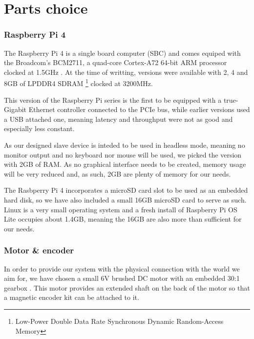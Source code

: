 \section{Parts choice} \label{sec:parts_choice}



\subsubsection{Raspberry Pi 4}
The Raspberry Pi 4 is a single board computer (SBC) and comes equiped with the Broadcom's BCM2711, a quad-core Cortex-A72 64-bit ARM processor clocked at 1.5GHz \cite{technology:rpi4-specs}.
At the time of writting, versions were available with 2, 4 and 8GB of LPDDR4 SDRAM \footnote{Low-Power Double Data Rate Synchronous Dynamic Random-Access Memory} clocked at 3200MHz.

This version of the Raspberry Pi series is the first to be equipped with a true-Gigabit Ethernet controller connected to the PCIe bus, while earlier versions used a USB attached one, meaning latency and throughput were not as good and especially less constant.

As our designed slave device is inteded to be used in headless mode, meaning no monitor output and no keyboard nor mouse will be used, we picked the version with 2GB of RAM.
As no graphical interface needs to be created, memory usage will be very reduced and, as such, 2GB are plenty of memory for our needs.

The Rasbperry Pi 4 incorporates a microSD card slot to be used as an embedded hard disk, so we have also included a small 16GB microSD card to serve as such.
Linux is a very small operating system and a fresh install of Raspberry Pi OS Lite occupies about 1.4GB, meaning the 16GB are also more than sufficient for our needs.

\subsubsection{Motor \& encoder}
In order to provide our system with the physical connection with the world we aim for, we have chosen a small 6V brushed DC motor with an embedded 30:1 gearbox \cite{product:dc_motor}.
This motor provides an extended shaft on the back of the motor so that a magnetic encoder kit can be attached to it.

